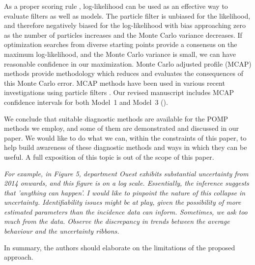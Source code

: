 \documentclass[11pt]{article}
\newcommand\report[1]{{\color{mygreen} \vspace{1mm}\hspace{0.25in}\parbox{6in}{\em #1}}}
\begin{document}
As a proper scoring rule \cite{gneiting07}, log-likelihood can be used as an effective way to evaluate filters as well as models.
The particle filter is unbiased for the likelihood, and therefore negatively biased for the log-likelihood with bias approaching zero as the number of particles increases and the Monte Carlo variance decreases.
If optimization searches from diverse starting points provide a consensus on the maximum log-likelihood, and the Monte Carlo variance is small, we can have reasonable confidence in our maximization.
Monte Carlo adjusted profile (MCAP) methods \cite{ionides17,ning21} provide methodology which reduces and evaluates the consequences of this Monte Carlo error.
MCAP methods have been used in various recent investigations using particle filters \cite{subramanian21,ali22,pons-salort18}.
Our revised manuscript includes MCAP confidence intervals for both Model~1 and Model~3 ().

We conclude that suitable diagnostic methods are available for the POMP methods we employ, and some of them are demonstrated and discussed in our paper.
We would like to do what we can, within the constraints of this paper, to help build awareness of these diagnostic methods and ways in which they can be useful.
A full exposition of this topic is out of the scope of this paper.

%

\report{
For example, in Figure 5, department Ouest exhibits substantial uncertainty from 2014 onwards, and this figure is on a log scale. Essentially, the inference suggests that 'anything can happen'. I would like to pinpoint the nature of this collapse in uncertainty. Identifiability issues might be at play, given the possibility of more estimated parameters than the incidence data can inform. Sometimes, we ask too much from the data. Observe the discrepancy in trends between the average behaviour and the uncertainty ribbons.

In summary, the authors should elaborate on the limitations of the proposed approach.
}
\end{document}
